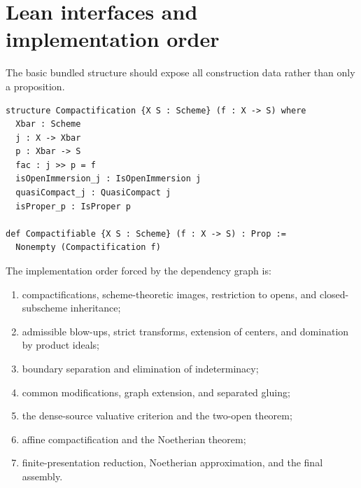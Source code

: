 \section{Lean interfaces and implementation order}

The basic bundled structure should expose all construction data rather than
only a proposition.

\begin{verbatim}
structure Compactification {X S : Scheme} (f : X -> S) where
  Xbar : Scheme
  j : X -> Xbar
  p : Xbar -> S
  fac : j >> p = f
  isOpenImmersion_j : IsOpenImmersion j
  quasiCompact_j : QuasiCompact j
  isProper_p : IsProper p

def Compactifiable {X S : Scheme} (f : X -> S) : Prop :=
  Nonempty (Compactification f)
\end{verbatim}

The implementation order forced by the dependency graph is:
\begin{enumerate}
  \item compactifications, scheme-theoretic images, restriction to opens, and
    closed-subscheme inheritance;
  \item admissible blow-ups, strict transforms, extension of centers, and
    domination by product ideals;
  \item boundary separation and elimination of indeterminacy;
  \item common modifications, graph extension, and separated gluing;
  \item the dense-source valuative criterion and the two-open theorem;
  \item affine compactification and the Noetherian theorem;
  \item finite-presentation reduction, Noetherian approximation, and the final
    assembly.
\end{enumerate}

